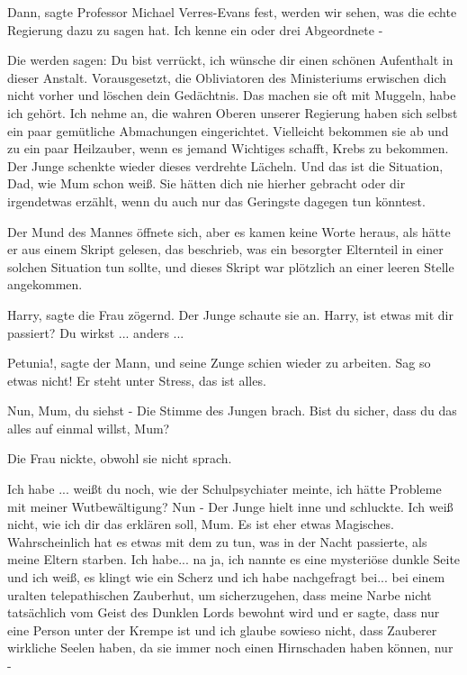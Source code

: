 \glqq{}Dann\grqq{}, sagte Professor Michael Verres-Evans fest, \glqq{}werden wir
sehen, was die echte Regierung dazu zu sagen hat. Ich kenne ein oder drei
Abgeordnete -\grqq{}

\glqq{}Die werden sagen: Du bist verrückt, ich wünsche dir einen schönen
Aufenthalt in dieser Anstalt. Vorausgesetzt, die Obliviatoren des Ministeriums
erwischen dich nicht vorher und löschen dein Gedächtnis. Das machen sie oft mit
Muggeln, habe ich gehört. Ich nehme an, die wahren Oberen unserer Regierung
haben sich selbst ein paar gemütliche Abmachungen eingerichtet. Vielleicht
bekommen sie ab und zu ein paar Heilzauber, wenn es jemand Wichtiges schafft,
Krebs zu bekommen.\grqq{} Der Junge schenkte wieder dieses verdrehte Lächeln.
\glqq{}Und das ist die Situation, Dad, wie Mum schon weiß. Sie hätten dich nie
hierher gebracht oder dir irgendetwas erzählt, wenn du auch nur das Geringste
dagegen tun könntest.\grqq{}

Der Mund des Mannes öffnete sich, aber es kamen keine Worte heraus, als hätte er
aus einem Skript gelesen, das beschrieb, was ein besorgter Elternteil in einer
solchen Situation tun sollte, und dieses Skript war plötzlich an einer leeren
Stelle angekommen.

\glqq{}Harry\grqq{}, sagte die Frau zögernd. Der Junge schaute sie an. \glqq{}
Harry, ist etwas mit dir passiert? Du wirkst ... anders ...\grqq{}

\glqq{}Petunia!\grqq{}, sagte der Mann, und seine Zunge schien wieder zu
arbeiten. \glqq{}Sag so etwas nicht! Er steht unter Stress, das ist alles.\grqq{}

\glqq{}Nun, Mum, du siehst -\grqq{} Die Stimme des Jungen brach. \glqq{}Bist du
sicher, dass du das alles auf einmal willst, Mum?\grqq{}

Die Frau nickte, obwohl sie nicht sprach.

\glqq{}Ich habe ... weißt du noch, wie der Schulpsychiater meinte, ich hätte
Probleme mit meiner Wutbewältigung? Nun -\grqq{} Der Junge hielt inne und
schluckte. \glqq{}Ich weiß nicht, wie ich dir das erklären soll, Mum. Es ist eher
etwas Magisches. Wahrscheinlich hat es etwas mit dem zu tun, was in der Nacht
passierte, als meine Eltern starben. Ich habe... na ja, ich nannte es eine
mysteriöse dunkle Seite und ich weiß, es klingt wie ein Scherz und ich habe
nachgefragt bei... bei einem uralten telepathischen Zauberhut, um sicherzugehen,
dass meine Narbe nicht tatsächlich vom Geist des Dunklen Lords bewohnt wird und
er sagte, dass nur eine Person unter der Krempe ist und ich glaube sowieso
nicht, dass Zauberer wirkliche Seelen haben, da sie immer noch einen Hirnschaden
haben können, nur -\grqq{}

